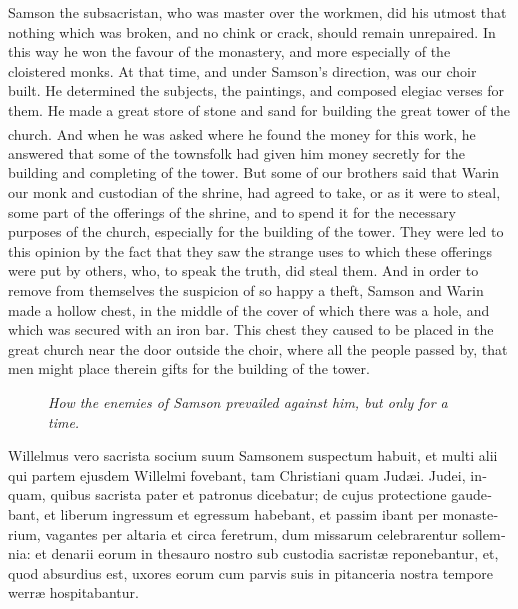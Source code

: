 \documentclass{book}
\newcounter{engnote}
\newcommand{\engnotenum}{\textsuperscript{\arabic{engnote}\stepcounter{engnote}}}
\newcommand{\blockhead}[4][]{
\begin{figure}
\centering
\vspace{#4}
\parbox{2.75cm}{\begin{center}\footnotesize \color{BrickRed} \emph{#2}\\ #1 \end{center}}
\end{figure}
}
\begin{document}
\begin{paracol}{2}
\begin{otherlanguage}{latin}
\end{otherlanguage}

\switchcolumn

Samson the subsacristan, who was master over the workmen, did his utmost that nothing which was broken, and no chink or crack, should remain unrepaired. In this way he won the favour of the monastery, and more especially of the cloistered monks. At that time, and under Samson's direction, was our choir built. He determined the subjects, the paintings, and composed elegiac verses for them. He made a great store of stone and sand for building the great tower of the church.\engnotenum{} And when he was asked where he found the money for this work, he answered that some of the townsfolk had given him money secretly for the building and completing of the tower. But some of our brothers said that Warin our monk and custodian of the shrine, had agreed to take, or as it were to steal, some part of the offerings of the shrine, and to spend it for the necessary purposes of the church, especially for the building of the tower. They were led to this opinion by the fact that they saw the strange uses to which these offerings were put by others, who, to speak the truth, did steal them. And in order to remove from themselves the suspicion of so happy a theft, Samson and Warin made a hollow chest, in the middle of the cover of which there was a hole, and which was secured with an iron bar. This chest they caused to be placed in the great church near the door outside the choir, where all the people passed by, that men might place therein gifts for the building of the tower.

\switchcolumn*

\begin{otherlanguage}{latin}
\blockhead{How the enemies of Samson prevailed against him, but only for a time.}{4}{-0.45cm}
Willelmus vero sacrista socium suum Samsonem suspectum habuit, et multi alii qui partem ejusdem Willelmi fovebant, tam Christiani quam Jud\ae{}i. Judei, inquam, quibus sacrista pater et patronus dicebatur; de cujus protectione gaudebant, et liberum ingressum et egressum habebant, et passim ibant per monasterium, vagantes per altaria et circa feretrum, dum missarum celebrarentur sollemnia: et denarii eorum in thesauro nostro sub custodia sacrist\ae{} reponebantur, et, quod absurdius est, uxores eorum cum parvis suis in pitanceria nostra tempore werr\ae{} hospitabantur.

\end{otherlanguage}


\end{paracol}
\end{document}
